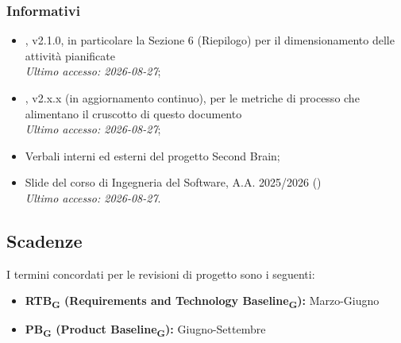 \subsubsection{Informativi}
\begin{itemize}
	\item {}, v2.1.0, in particolare la Sezione 6 (Riepilogo) per il dimensionamento delle attività pianificate \\
	\textit{Ultimo accesso: 2026-08-27};
	\item {}, v2.x.x (in aggiornamento continuo), per le metriche di processo che alimentano il cruscotto di questo documento \\
	\textit{Ultimo accesso: 2026-08-27};
	\item Verbali interni ed esterni del progetto Second Brain;
	
	\item Slide del corso di Ingegneria del Software, A.A. 2025/2026
	() \\
	\textit{Ultimo accesso: 2026-08-27}.
\end{itemize}

\subsection{Scadenze}
I termini concordati per le revisioni di progetto sono i seguenti:
\begin{itemize}
	\item \textbf{RTB\textsubscript{G} (Requirements and Technology Baseline\textsubscript{G}):} {Marzo-Giugno}
	\item \textbf{PB\textsubscript{G} (Product Baseline\textsubscript{G}):} {Giugno-Settembre}
\end{itemize}